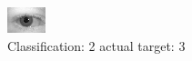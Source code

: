 \begin{figure}[h!]
\begin{center}
\includegraphics[width=0.60\columnwidth]{figures/ID535_class_2_target_3.png}
\end{center}
\caption{ Classification: 2 actual target: 3}
\label{fig:ID535_class_2_target_3}
\end{figure}
